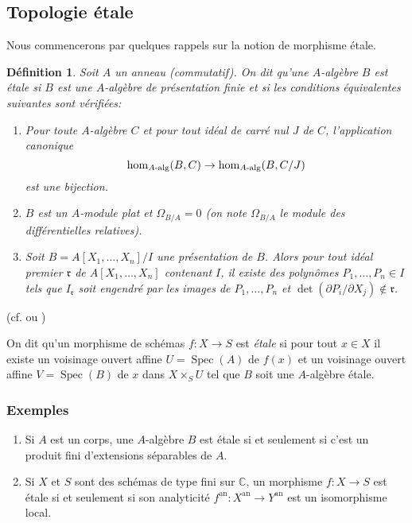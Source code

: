 \documentclass{book}
\DeclareMathOperator{\spec}{Spec}
\newcommand{\dC}{\mathbb{C}}
\newcommand{\fr}{\mathfrak{r}}
\newtheorem{definition}[subsubsection]{Définition}
\begin{document}
\subsection{Topologie étale}\label{I:2-1}

Nous commencerons par quelques rappels sur la notion de morphisme étale. 

\begin{definition}\label{I:2-1-1}
Soit $A$ un anneau (commutatif). On dit qu'une $A$-algèbre $B$ est étale si 
$B$ est une $A$-algèbre de présentation finie et si les conditions 
équivalentes suivantes sont vérifiées:
\begin{enumerate}[\indent a)]
  \item Pour toute $A$-algèbre $C$ et pour tout idéal de carré nul $J$ de 
    $C$, l'application canonique 
    \[
      \hom_{A\textnormal{-alg}}(B,C) \to \hom_{A\textnormal{-alg}}(B,C/J)
    \]
    est une bijection.
  \item $B$ est un $A$-module plat et $\Omega_{B/A}=0$ (on note $\Omega_{B/A}$ 
    le module des différentielles relatives).
  \item Soit $B=A[X_1,\dotsc,X_n]/I$ une présentation de $B$. Alors pour tout 
    idéal premier $\fr$ de $A[X_1,\dotsc,X_n]$ contenant $I$, il existe des 
    polynômes $P_1,\dotsc,P_n\in I$ tels que $I_\fr$ soit engendré par les 
    images de $P_1,\dotsc,P_n$ et $\det(\partial P_i/\partial X_j)\notin \fr$.  
\end{enumerate}
\end{definition}
(cf. \cite[I]{7} ou \cite[V]{11})

On dit qu'un morphisme de schémas $f:X\to S$ est \emph{étale} si pour tout 
$x\in X$ il existe un voisinage ouvert affine $U=\spec(A)$ de $f(x)$ et un 
voisinage ouvert affine $V=\spec(B)$ de $x$ dans $X\times_S U$ tel que $B$ soit 
une $A$-algèbre étale. 





\subsubsection{Exemples}\label{I:2-1-2}
\begin{enumerate}[\indent a)]
  \item Si $A$ est un corps, une $A$-algèbre $B$ est étale si et seulement 
    si c'est un produit fini d'extensions séparables de $A$. 
  \item Si $X$ et $S$ sont des schémas de type fini sur $\dC$, un morphisme 
    $f:X\to S$ est étale si et seulement si son analyticité 
    $f^{\text{an}}:X^{\text{an}}\to Y^{\text{an}}$ est un isomorphisme local.
\end{enumerate}
\end{document}
